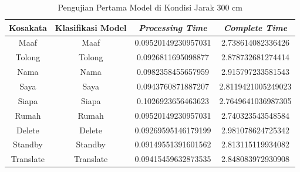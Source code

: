 \begin{longtable}{|c|c|c|c|}
  \caption{Pengujian Pertama Model di Kondisi Jarak 300 cm}
  \label{tb:prediksijauh1}                                   \\
  \hline
  \rowcolor[HTML]{C0C0C0}
  \textbf{Kosakata} & \textbf{Klasifikasi Model} & \textbf{\emph{Processing Time}} & \textbf{\emph{Complete Time}}\\
  \hline
  Maaf              & Maaf                        & 0.09520149230957031                           & 2.738614082336426                                  \\
  Tolong            & Tolong                        & 0.0926811695098877                           & 2.878732681274414                                  \\
  Nama              & Nama                        & 0.0982358455657959                           & 2.915797233581543                                  \\
  Saya              & Saya                        & 0.0943760871887207                           & 2.8119421005249023                                  \\
  Siapa              & Siapa                        & 0.1026923656463623                           & 2.7649641036987305                                  \\
  Rumah             & Rumah                        & 0.09520149230957031                           & 2.740323543548584                                  \\
  Delete            & Delete                        & 0.09269595146179199                           & 2.981078624725342                                  \\
  Standby           & Standby                        & 0.09149551391601562                           & 2.813115119934082                                  \\
  Translate         & Translate                        & 0.09415459632873535                           & 2.848083972930908                                  \\
  \hline
\end{longtable}

